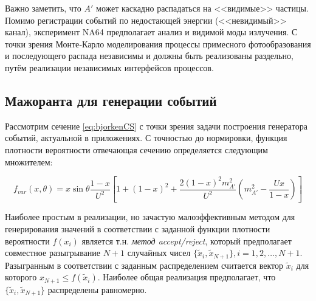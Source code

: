 
Важно заметить, что $A'$ может каскадно распадаться на <<видимые>> частицы.
Помимо регистрации событий по недостающей энергии (<<невидимый>> канал),
эксперимент NA64 предполагает анализ и видимой моды излучения. С точки
зрения Монте‐Карло моделирования процессы примесного фотообразования и
последующего распада независимы и должны быть реализованы раздельно,
путём реализации независимых интерфейсов процессов.

%    


\subsection{Мажоранта для генерации событий}

Рассмотрим сечение \eqref{eq:bjorkenCS} с точки зрения задачи
построения генератора событий, актуальной в приложениях. С точностью до
нормировки, функция плотности вероятности отвечающая сечению определяется
следующим множителем:

\begin{equation}
    f_{var}(x, \theta) = x \sin \theta \frac{1-x}{U^2} \left[
        1 + (1-x)^2 + \frac{ 2 (1-x)^2 m_{A'}^2 }{U^2} \left( m_{A'}^2 - \frac{U x}{1-x} \right)
        \right]
\label{eq:bjorkenVarPDF}
\end{equation}

Наиболее простым в реализации, но зачастую малоэффективным методом для
генерирования значений в соответствии с заданной функции плотности
вероятности $f(x_i)$ является т.н. \emph{метод accept/reject}, который
предполагает совместное разыгрывание $N+1$ случайных
чисел $\{\tilde{x}_i, \tilde{x}_{N+1}\}, i = 1, 2, \dots, N+1$. Разыгранным в
соответствии с заданным распределением считается вектор $\tilde{x}_i$ для
которого $x_{N+1} \le f(\tilde{x}_i)$. Наиболее общая реализация
предполагает, что $\{\tilde{x}_i, \tilde{x}_{N+1}\}$ распределены равномерно.

